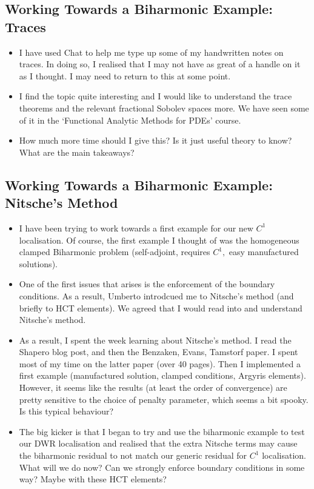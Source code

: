 \documentclass[12pt,a4paper]{article}
\begin{document}
\newpage


\subsection{Working Towards a Biharmonic Example: Traces}

\begin{itemize}
    \item I have used Chat to help me type up some of my handwritten notes on traces. In doing so, I realised that I may not have as great of a handle on it as I thought. I may need to return to this at some point. 
    \item I find the topic quite interesting and I would like to understand the trace theorems and the relevant fractional Sobolev spaces more. We have seen some of it in the `Functional Analytic Methods for PDEs' course. 
    \item How much more time should I give this? Is it just useful theory to know? What are the main takeaways?

\end{itemize}


\subsection{Working Towards a Biharmonic Example: Nitsche's Method}

\begin{itemize}
    \item I have been trying to work towards a first example for our new $C^1$ localisation. Of course, the first example I thought of was the homogeneous clamped Biharmonic problem (self-adjoint, requires $C^1,$ easy manufactured solutions). 
    \item One of the first issues that arises is the enforcement of the boundary conditions. As a result, Umberto introdcued me to Nitsche's method (and briefly to HCT elements). We agreed that I would read into and understand Nitsche's method.
    \item As a result, I spent the week learning about Nitsche's method. I read the Shapero blog post, and then the Benzaken, Evans, Tamstorf paper. I spent most of my time on the latter paper (over 40 pages). Then I implemented a first example (manufactured solution, clamped conditions, Argyris elements). However, it seems like the results (at least the order of convergence) are pretty sensitive to the choice of penalty parameter, which seems a bit spooky. Is this typical behaviour? 
    \item The big kicker is that I began to try and use the biharmonic example to test our DWR localisation and realised that the extra Nitsche terms may cause the biharmonic residual to not match our generic residual for $C^1$ localisation. What will we do now? Can we strongly enforce boundary conditions in some way? Maybe with these HCT elements? 
\end{itemize}
\end{document}
